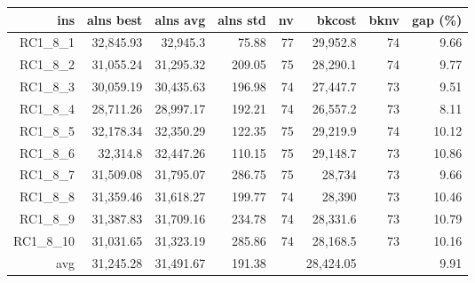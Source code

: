   \begin{table}[caption={Kết quả đo với tập HG\_RC\_1\_8 800 yêu cầu}, label=exp:HGRC18]
    \small
    \centering
    \begin{tabular}{rrrrrrrr}
    \hline
    ins & alns best & alns avg & alns std & nv & bkcost & bknv & gap (\%) \\ \hline
    RC1\_8\_1 & 32,845.93 & 32,945.3 & 75.88 & 77 & 29,952.8 & 74 & 9.66 \\ \hline
    RC1\_8\_2 & 31,055.24 & 31,295.32 & 209.05 & 75 & 28,290.1 & 74 & 9.77 \\ \hline
    RC1\_8\_3 & 30,059.19 & 30,435.63 & 196.98 & 74 & 27,447.7 & 73 & 9.51 \\ \hline
    RC1\_8\_4 & 28,711.26 & 28,997.17 & 192.21 & 74 & 26,557.2 & 73 & 8.11 \\ \hline
    RC1\_8\_5 & 32,178.34 & 32,350.29 & 122.35 & 75 & 29,219.9 & 74 & 10.12 \\ \hline
    RC1\_8\_6 & 32,314.8 & 32,447.26 & 110.15 & 75 & 29,148.7 & 73 & 10.86 \\ \hline
    RC1\_8\_7 & 31,509.08 & 31,795.07 & 286.75 & 75 & 28,734 & 73 & 9.66 \\ \hline
    RC1\_8\_8 & 31,359.46 & 31,618.27 & 199.77 & 74 & 28,390 & 73 & 10.46 \\ \hline
    RC1\_8\_9 & 31,387.83 & 31,709.16 & 234.78 & 74 & 28,331.6 & 73 & 10.79 \\ \hline
    RC1\_8\_10 & 31,031.65 & 31,323.19 & 285.86 & 74 & 28,168.5 & 73 & 10.16 \\ \hline
    avg & 31,245.28 & 31,491.67 & 191.38 & & 28,424.05 & & 9.91 \\ \hline
    \end{tabular}
  \end{table}


